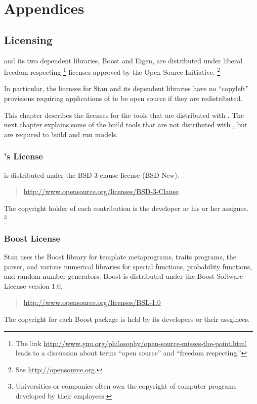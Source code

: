 \part*{Appendices}


\chapter{Licensing}\label{licensing.appendix}

\noindent
\Stan and its two dependent libraries, Boost and Eigen, are
distributed under liberal freedom-respecting%
%
\footnote{The link
  \url{http://www.gnu.org/philosophy/open-source-misses-the-point.html}
  leads to a discussion about terms ``open
  source'' and ``freedom respecting.''}
%
licenses approved by the Open Source Initiative.%
\footnote{See \url{http://opensource.org}.}  

In particular, the licenses for Stan and its dependent libraries have
no ``copyleft'' provisions requiring applications of \Stan to be
open source if they are redistributed.

This chapter describes the licenses for the tools that are distributed
with \Stan.  The next chapter explains some of the build tools that
are not distributed with \Stan, but are required to build and run
\Stan models.

\section{\Stan's License}

\Stan is distributed under the BSD 3-clause license (BSD New).
%
\begin{quote}
\url{http://www.opensource.org/licenses/BSD-3-Clause}
\end{quote}
%
The copyright holder of each contribution is the developer or his or
her assignee.%
%
\footnote{Universities or companies often own the copyright of
  computer programs developed by their employees.}


\section{Boost License}

Stan uses the Boost library for template metaprograms, traits
programs, the parser, and various numerical libraries for special
functions, probability functions, and random number generators.  Boost
is distributed under the Boost Software License version 1.0.
%
\begin{quote}
\url{http://www.opensource.org/licenses/BSL-1.0}
\end{quote}
%
The copyright for each Boost package is held by its developers or their
assginees.


